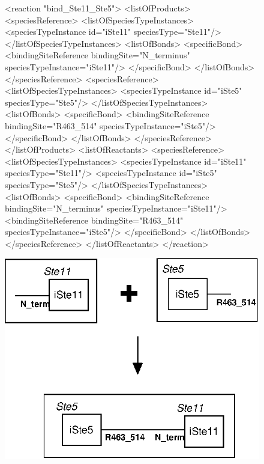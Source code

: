 \documentclass{cekarticle}
\begin{document}
\begin{figure}[h]
\begin{example}
<reaction "bind_Ste11_Ste5">
    <listOfProducts>
        <speciesReference>
            <listOfSpeciesTypeInstances>
                <speciesTypeInstance id="iSte11" speciesType="Ste11"/>
            </listOfSpeciesTypeInstances>
            <listOfBonds>
                <specificBond>
                    <bindingSiteReference bindingSite="N_terminus" speciesTypeInstance="iSte11"/>
                </specificBond>
            </listOfBonds>
        </speciesReference>
        <speciesReference>
            <listOfSpeciesTypeInstances>
                <speciesTypeInstance id="iSte5" speciesType="Ste5"/>
            </listOfSpeciesTypeInstances>
            <listOfBonds>
                <specificBond>
                    <bindingSiteReference bindingSite="R463_514" speciesTypeInstance="iSte5"/>
                </specificBond>
            </listOfBonds>
        </speciesReference>
    </listOfProducts>
    <listOfReactants>
        <speciesReference>
            <listOfSpeciesTypeInstances>
                <speciesTypeInstance id="iSte11" speciesType="Ste11"/>
                <speciesTypeInstance id="iSte5" speciesType="Ste5"/>
            </listOfSpeciesTypeInstances>
            <listOfBonds>
                <specificBond>
                    <bindingSiteReference bindingSite="N_terminus" speciesTypeInstance="iSte11"/>
                    <bindingSiteReference bindingSite="R463_514" speciesTypeInstance="iSte5"/>
                </specificBond>
            </listOfBonds>
        </speciesReference>
    </listOfReactants>
</reaction>
\end{example}
  \vspace*{8pt}
  \centering
  \includegraphics[scale = 0.7]{bind_Ste11_Ste5_v2.eps}
  

\end{figure}
\end{document}

